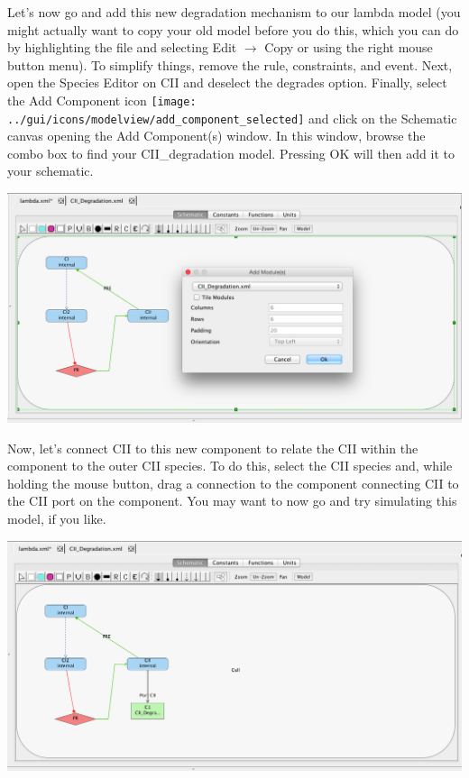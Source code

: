 \documentclass[titlepage,11pt]{article}
\begin{document}
Let's now go and add this new degradation mechanism to our lambda model (you might actually want to copy your old model before you do this, which you can do by highlighting the file and selecting Edit $\rightarrow$ Copy or using the right mouse button menu).   To simplify things, remove the rule, constraints, and event.  Next, open the Species Editor on CII and deselect the degrades option.  Finally, select the Add Component icon \texttt{[image: ../gui/icons/modelview/add\_component\_selected]} and click on the Schematic canvas opening the Add Component(s) window.  In this window, browse the combo box to find your CII\_degradation model.  Pressing OK will then add it to your schematic.

\begin{center}
\includegraphics[width=160mm]{screenshots/addComponent}
\end{center}

Now, let's connect CII to this new component to relate the CII within the component to the outer CII species.  To do this, select the CII species and, while holding the mouse button, drag a connection to the component connecting CII to the CII port on the component.  
You may want to now go and try simulating this model, if you like.

\begin{center}
\includegraphics[width=160mm]{screenshots/addPort}
\end{center}
\end{document}
